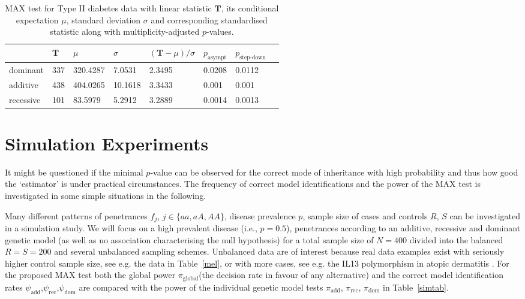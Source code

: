 \documentclass[bimj,fleqn]{w-art}
\newcommand{\T}{\mathbf{T}}
\begin{document}
\begin{table}
\begin{center}
\caption{MAX test for Type II diabetes data  with linear statistic  
         $\T$, its conditional expectation $\mu$, standard deviation 
         $\sigma$ and corresponding standardised statistic along with 
         multiplicity-adjusted $p$-values. \label{diares}}
\vspace*{0.5cm}
\begin{tabular}{l l l l l l l l}
 & $\T$ & $\mu$ & $ \sigma$ & $(\T - \mu) / \sigma$ & $p_\text{asympt}$ & $p_\text{step-down}$ \\ \hline
dominant  &  337 & 320.4287 & 7.0531 & 2.3495 & 0.0208 & 0.0112 \\ 
additive  &  438 & 404.0265 & 10.1618 & 3.3433 & 0.001 & 0.001 \\ 
recessive  &  101 & 83.5979 & 5.2912 & 3.2889 & 0.0014 & 0.0013 \\ \hline
\end{tabular}
\end{center}
\end{table}

\section{Simulation Experiments \label{sim}}

It might be questioned if the minimal $p$-value can be observed for the
correct mode of inheritance with high probability and thus how good the `estimator' 
is under practical circumstances. The frequency of
correct model identifications and the power of the MAX test is investigated
in some simple situations in the following.

Many different patterns of penetrances $f_j$, $j \in \{aa, aA, AA\}$, 
disease prevalence $p$, sample size of cases and controls 
$R$, $S$ can be investigated in a simulation study. We will 
focus on a high prevalent disease (i.e., $p=0.5$), penetrances according 
to an additive, recessive and dominant genetic model (as well as no 
association characterising the null hypothesis) for a total sample size 
of $N=400$ divided into the balanced $R=S=200$ and several unbalanced sampling schemes. 
Unbalanced data are of interest because real data examples exist with 
seriously higher control sample size, see e.g. the data in Table~\ref{mel}, 
or with more cases, see e.g. the IL13 polymorphism in atopic 
dermatitis \citet[][Table~4 therein]{Neuhauser:2002}. For the proposed MAX test both the global 
power $\pi_\text{global}$(the decision rate in favour of any alternative) and the 
correct model identification rates $\psi_\text{add}$,$\psi_\text{rec}$,$\psi_\text{dom}$ 
are compared with the power of the individual genetic model tests 
$\pi_\text{add}$, $\pi_\text{rec}$, $\pi_\text{dom}$ in Table~\ref{simtab}.
\end{document}
